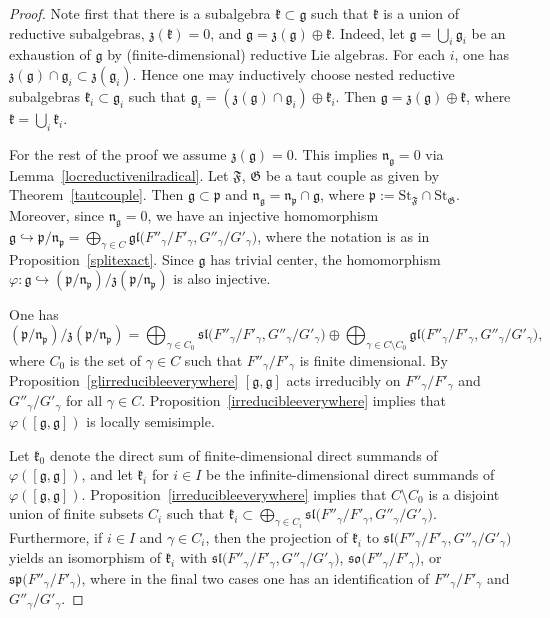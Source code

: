 \documentclass{article}
\newcommand {\St} {\mathrm{St}}
\def\gl{\mathfrak {gl}}
\def\g{\mathfrak {g}}
\def\n{\mathfrak {n}}
\def\p{\mathfrak {p}}
\def\sl{\mathfrak{sl}}
\def\so{\mathfrak{so}}
\def\sp{\mathfrak{sp}}
\def\z{\mathfrak {z}}
\def\k{\mathfrak{k}}
\def\F{\mathfrak{F}}
\def\G{\mathfrak{G}}
\begin{document}
\begin{proof}
Note first that there is a subalgebra $\k \subset \g$ such that $\k$ is a union of reductive subalgebras, $\z(\k) = 0$, and $\g = \z(\g) \oplus \k$.  Indeed, let $\g = \bigcup_i \g_i$ be an exhaustion of $\g$ by (finite-dimensional) reductive Lie algebras.  For each $i$, one has $\z(\g) \cap \g_i \subset \z(\g_i)$.  Hence one may inductively choose nested reductive subalgebras $\k_i \subset \g_i$ such that $\g_i = (\z(\g) \cap \g_i) \oplus \k_i$.    Then $\g = \z(\g) \oplus \k$, where $\k = \bigcup_i \k_i$.

For the rest of the proof we assume $\z(\g) = 0$.  This implies $\n_\g = 0$ via Lemma~\ref{locreductivenilradical}.  Let $\F$, $\G$ be a taut couple as given by Theorem~\ref{tautcouple}. Then $\g \subset \p$ and $\n_\g = \n_\p \cap \g$, where $\p := \St_\F \cap \St_\G$.  Moreover, since $\n_\g = 0$, we have an injective homomorphism $\g \hookrightarrow {\p} / {\n_\p} = \bigoplus_{\gamma \in C} \gl\big({F''_\gamma} / {F'_\gamma} , {G''_\gamma} / {G'_\gamma}\big)$, where the notation is as in Proposition~\ref{splitexact}.  Since $\g$ has trivial center, the homomorphism $\varphi \colon \g \hookrightarrow ({\p} / {\n_\p}) / \z({\p} / {\n_\p})$ is also injective.  

One has $$({\p} / {\n_\p}) / \z({\p} / {\n_\p}) =  \bigoplus_{\gamma \in C_0} \sl\big({F''_\gamma} / {F'_\gamma} , {G''_\gamma} / {G'_\gamma}\big) \oplus  \bigoplus_{\gamma \in C \setminus C_0} \gl\big({F''_\gamma} / {F'_\gamma} , {G''_\gamma} / {G'_\gamma}\big),$$ where $C_0$ is the set of $\gamma \in C$ such that ${F''_\gamma} / {F'_\gamma}$ is finite dimensional.  
By Proposition~\ref{glirreducibleeverywhere} $[\g,\g]$ acts irreducibly on ${F''_\gamma} / {F'_\gamma}$ and ${G''_\gamma} / {G'_\gamma}$ for all $\gamma \in C$.  Proposition~\ref{irreducibleeverywhere} implies that $\varphi([\g,\g])$ is locally semisimple.  

Let $\k_0$ denote the direct sum of finite-dimensional direct summands of $\varphi([\g,\g])$, and let $\k_i$ for $i \in I$ be the infinite-dimensional direct summands of $\varphi([\g,\g])$. 
Proposition~\ref{irreducibleeverywhere} implies
that $C \setminus C_0$ is a disjoint union of finite subsets $C_i$ such that 
$\k_i \subset \bigoplus_{\gamma \in C_i} \sl\big({F''_\gamma} / {F'_\gamma} , {G''_\gamma} / {G'_\gamma}\big)$.  Furthermore, if $i \in I$ and $\gamma \in C_i$, then the projection of $\k_i$ to $\sl\big({F''_\gamma} / {F'_\gamma} , {G''_\gamma} / {G'_\gamma}\big)$ yields an isomorphism of $\k_i$ with $\sl\big({F''_\gamma} / {F'_\gamma}, {G''_\gamma} / {G'_\gamma}\big)$, $\so\big({F''_\gamma} / {F'_\gamma}\big)$, or $\sp\big({F''_\gamma} / {F'_\gamma}\big)$, where in the final two cases one has an identification of ${F''_\gamma} / {F'_\gamma}$ and ${G''_\gamma} / {G'_\gamma}$.


\end{proof}
\end{document}

